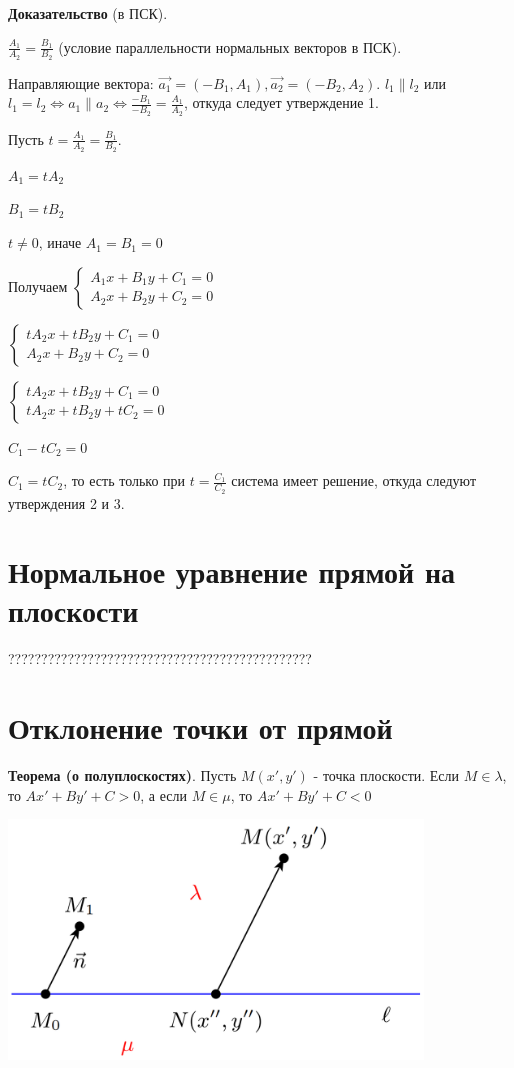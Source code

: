 \documentclass[a4paper]{article}
\begin{document}
{\begin{small}
\textbf{Доказательство} (в ПСК).

$\displaystyle \frac{A_1}{A_2} = \frac{B_1}{B_2}$ (условие параллельности нормальных векторов в ПСК). 

Направляющие вектора: $\vec{a_1} = (-B_1, A_1), \vec{a_2} = (-B_2, A_2)$. \newline $l_1 \parallel l_2$ или $\displaystyle l_1 = l_2 \Leftrightarrow a_1 \parallel a_2 \Leftrightarrow \frac{-B_1}{-B_2} = \frac{A_1}{A_2}$, откуда следует утверждение 1.

Пусть $t = \frac{A_1}{A_2} = \frac{B_1}{B_2}$. 

$A_1 = tA_2$

$B_1 = tB_2$

$t \neq 0$, иначе $A_1 = B_1 = 0$

Получаем $
\begin{cases}
   A_1x+B_1y+C_1 = 0
   \\
   A_2x + B_2y+C_2 = 0
 \end{cases}
$

$
\begin{cases}
   tA_2x+tB_2y+C_1 = 0
   \\
   A_2x + B_2y+C_2 = 0
 \end{cases}
$

$
\begin{cases}
   tA_2x+tB_2y+C_1 = 0
   \\
   tA_2x + tB_2y+tC_2 = 0
 \end{cases}
$

$C_1 - tC_2 = 0$

$C_1 = tC_2$, то есть только при $\displaystyle t=\frac{C_1}{C_2}$ система имеет решение, откуда следуют утверждения 2 и 3.

\section*{Нормальное уравнение прямой на плоскости}
??????????????????????????????????????????????

\section*{Отклонение точки от прямой}
\textbf{Теорема (о полуплоскостях)}. Пусть $M(x', y')$ - точка плоскости. Если $M \in \lambda$, то $Ax' + By' + C > 0$, а если $M \in \mu $, то $Ax' + By' + C < 0$ 

\includegraphics[width=11cm]{t7}


\end{small}}
\end{document}

